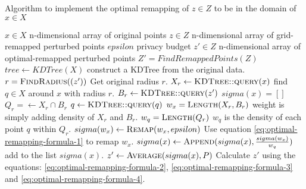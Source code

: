 \begin{algorithm}[H]
  \caption{Algorithm to implement the optimal remapping of $z \in Z$ to be in the domain of $x \in X$}
  \begin{algorithmic}
    \Require $x \in X$  \Comment n-dimensional array of original points
    \Require $z \in Z$ \Comment n-dimensional array of grid-remapped perturbed points
    \Require $epsilon$ \Comment privacy budget
    \Ensure $z' \in Z$ \Comment n-dimensional array of optimal-remapped perturbed points
    \State $Z' = FindRemappedPoints(Z)$
    \State $tree \gets KDTree(X)$ \Comment construct a KDTree from the original data.
    \State $r = \Call{FindRadius}{(z')}$ \Comment Get original radius $r$.
    \State $X_r \gets \Call{KDTree::query}{x}$ \Comment find $q \in X$ around $x$ with radius $r$.
    \State $B_r \gets \Call{KDTree::query}{z'} $
    \State $sigma(x) = []$
    \State $Q_r = \gets X_r \cap B_r$
    \State $q \gets \Call{KDTree::query}{q}$
    \State $w_x = \Call{Length}{X_r, B_r}$ \Comment weight is simply adding density of $X_r$ and $B_r$.
    \State $w_q = \Call{Length}{Q_r}$ \Comment $w_q$ is the density of each point $q$ within $Q_r$.
    \State $sigma(w_x) \gets \Call{Remap}{w_x, epsilon}$ \Comment Use equation \ref{eq:optimal-remapping-formula-1} to remap $w_x$.
    \State $sigma(x) \gets \Call{Append}{sigma(x), \frac{sigma(w_x)}{w_q}}$ \Comment add to the list $sigma(x)$.
    \EndFor
    \State $z' \gets \Call{Average}{sigma(x), P}$ \Comment Calculate $z'$ using the equations: \ref{eq:optimal-remapping-formula-2}, \ref{eq:optimal-remapping-formula-3} and \ref{eq:optimal-remapping-formula-4}.
    \EndFor
  \end{algorithmic}
  \label{alg:optimal-remapping-laplace}
\end{algorithm}
